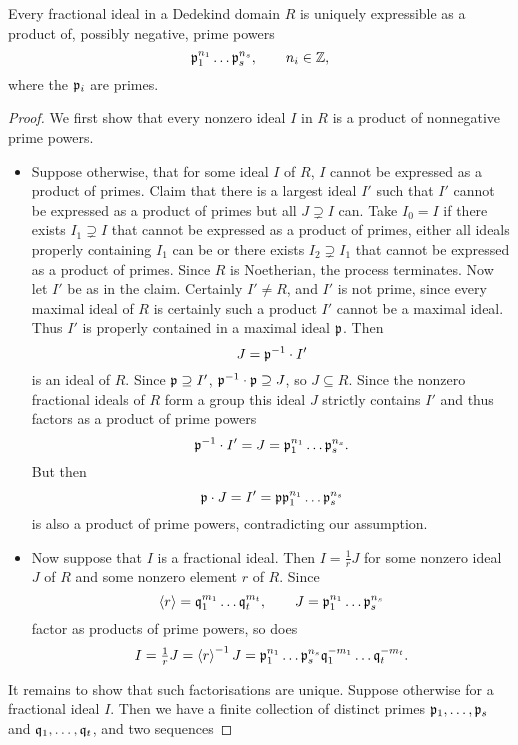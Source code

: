 \pagebreak

\begin{proposition}
Every fractional ideal in a Dedekind domain $ R $ is uniquely expressible as a product of, possibly negative, prime powers
$$ \mathfrak{p}_1^{n_1} \dots \mathfrak{p}_s^{n_s}, \qquad n_i \in \mathbb{Z}, $$
where the $ \mathfrak{p}_i $ are primes.
\end{proposition}

\begin{proof}
We first show that every nonzero ideal $ I $ in $ R $ is a product of nonnegative prime powers.
\begin{itemize}
\item Suppose otherwise, that for some ideal $ I $ of $ R $, $ I $ cannot be expressed as a product of primes. Claim that there is a largest ideal $ I' $ such that $ I' $ cannot be expressed as a product of primes but all $ J \supsetneq I $ can. Take $ I_0 = I $ if there exists $ I_1 \supsetneq I $ that cannot be expressed as a product of primes, either all ideals properly containing $ I_1 $ can be or there exists $ I_2 \supsetneq I_1 $ that cannot be expressed as a product of primes. Since $ R $ is Noetherian, the process terminates. Now let $ I' $ be as in the claim. Certainly $ I' \ne R $, and $ I' $ is not prime, since every maximal ideal of $ R $ is certainly such a product $ I' $ cannot be a maximal ideal. Thus $ I' $ is properly contained in a maximal ideal $ \mathfrak{p} $. Then
$$ J = \mathfrak{p}^{-1} \cdot I' $$
is an ideal of $ R $. Since $ \mathfrak{p} \supseteq I' $, $ \mathfrak{p}^{-1} \cdot \mathfrak{p} \supseteq J $, so $ J \subseteq R $. Since the nonzero fractional ideals of $ R $ form a group this ideal $ J $ strictly contains $ I' $ and thus factors as a product of prime powers
$$ \mathfrak{p}^{-1} \cdot I' = J = \mathfrak{p}_1^{n_1} \dots \mathfrak{p}_s^{n_s}. $$
But then
$$ \mathfrak{p} \cdot J = I' = \mathfrak{p}\mathfrak{p}_1^{n_1} \dots \mathfrak{p}_s^{n_s} $$
is also a product of prime powers, contradicting our assumption.
\item Now suppose that $ I $ is a fractional ideal. Then $ I = \tfrac{1}{r}J $ for some nonzero ideal $ J $ of $ R $ and some nonzero element $ r $ of $ R $. Since
$$ \left\langle r \right\rangle = \mathfrak{q}_1^{m_1} \dots \mathfrak{q}_t^{m_t}, \qquad J = \mathfrak{p}_1^{n_1} \dots \mathfrak{p}_s^{n_s} $$
factor as products of prime powers, so does
$$ I = \tfrac{1}{r}J = \left\langle r \right\rangle^{-1}J = \mathfrak{p}_1^{n_1} \dots \mathfrak{p}_s^{n_s}\mathfrak{q}_1^{-m_1} \dots \mathfrak{q}_t^{-m_t}. $$
\end{itemize}
It remains to show that such factorisations are unique. Suppose otherwise for a fractional ideal $ I $. Then we have a finite collection of distinct primes $ \mathfrak{p}_1, \dots, \mathfrak{p}_s $ and $ \mathfrak{q}_1, \dots, \mathfrak{q}_t $, and two sequences

\end{proof}
